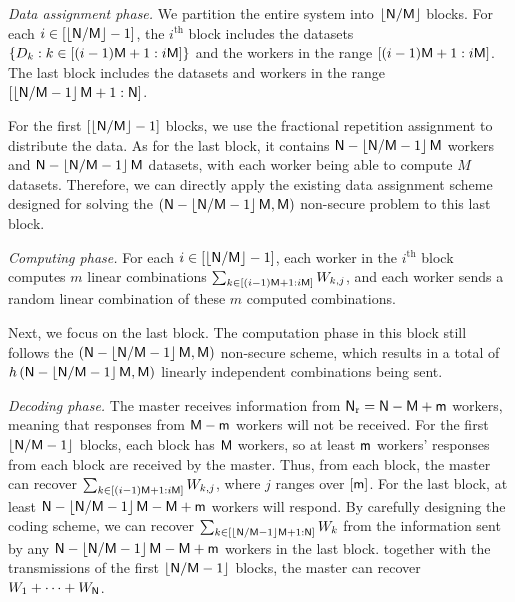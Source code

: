 \documentclass[conference,letterpaper]{IEEEtran}
\begin{document}
{\it Data assignment phase.}
We partition the entire system into $\left\lfloor  {\sf N}/{\sf M} \right\rfloor $ blocks. For each $i \in [\left\lfloor {\sf N}/{\sf M} \right\rfloor - 1]$, the $i^{\text{th}}$ block includes the datasets $\{ D_{k}: k \in \left[(i-1){\sf M}+1: i{\sf M} \right]\}$ and the workers in the range $\left[(i-1){\sf M}+1: i{\sf M} \right]$.
The last block includes the datasets and workers in the range $\left[\left\lfloor {\sf N}/{\sf M} - 1 \right\rfloor {\sf M} + 1 : {\sf N} \right]$.

For the first $\left[\left\lfloor {\sf N}/{\sf M} \right\rfloor - 1\right]$ blocks, we use the fractional repetition assignment to distribute the data. As for the last block, it contains ${\sf N} - \left\lfloor {\sf N}/{\sf M} - 1 \right\rfloor {\sf M}$ workers and ${\sf N} - \left\lfloor {\sf N}/{\sf M} - 1 \right\rfloor {\sf M}$ datasets, with each worker being able to compute $M$ datasets. Therefore, we can directly apply the existing data assignment scheme designed for solving the $({\sf N} - \left\lfloor {\sf N}/{\sf M} - 1 \right\rfloor {\sf M}, {\sf M})$ non-secure problem to this last block.

{\it Computing phase.}
For each $i \in \left[\left\lfloor {\sf N}/{\sf M} \right\rfloor - 1\right]$, each worker in the $i^{\text{th}}$ block computes $m$ linear combinations $\sum_{k\in \left[(i-1){\sf M} + 1 : i{\sf M}\right]} W_{k,j}$,  and each worker sends a random linear combination of these $m$ computed combinations.

Next, we focus on the last block. The computation phase in this block still follows the $({\sf N} - \left\lfloor {\sf N}/{\sf M} - 1 \right\rfloor {\sf M}, {\sf M})$ non-secure scheme, which results in a total of $h\left({\sf N} - \left\lfloor {\sf N}/{\sf M} - 1 \right\rfloor {\sf M}, {\sf M}\right)$ linearly independent combinations being sent.



{\it Decoding phase.}
The master receives information from ${\sf N}_{\rm r} = {\sf N} - {\sf M} + {\sf m}$ workers, meaning that responses from ${\sf M} - {\sf m}$ workers will not be received. For the first $\left\lfloor {\sf N}/{\sf M} - 1 \right\rfloor$ blocks, each block has ${\sf M}$ workers, so at least ${\sf m}$ workers' responses from each block are received by the master. Thus, from each block, the master can recover $\sum_{k \in \left[(i-1){\sf M} + 1 : i{\sf M}\right]} W_{k,j}$, where $j$ ranges over $[{\sf m}]$. 
For the last block, at least ${\sf N} - \left\lfloor {\sf N}/{\sf M} - 1 \right\rfloor {\sf M} - {\sf M} + {\sf m}$ workers will respond. By carefully designing the coding scheme, we can recover $\sum_{k \in \left[\left\lfloor {\sf N}/{\sf M} - 1 \right\rfloor {\sf M} + 1 : {\sf N}\right]} W_k$ from the information sent by any ${\sf N} - \left\lfloor {\sf N}/{\sf M} - 1 \right\rfloor {\sf M} - {\sf M} + {\sf m}$ workers in the last block.
together with the transmissions of the first $\left\lfloor  {\sf N}/{\sf M} -1 \right\rfloor$ blocks, the master can recover $W_1 + \cdots +W_{{\sf N}}$.
\end{document}
